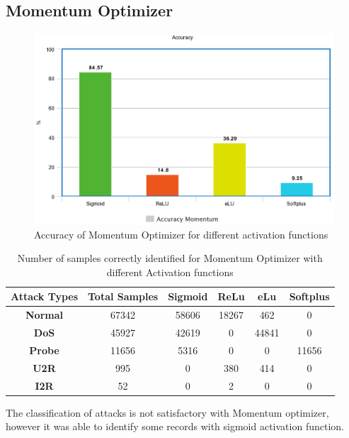 \documentclass[12pt, a4paper]{report}
\begin{document}
\subsection {Momentum Optimizer}
\begin{figure}[ht]
\centering
\captionsetup{justification=centering,margin=2cm}
\includegraphics[width=13cm]{accuracy_momentum_greedy.png}
\caption{ Accuracy of Momentum Optimizer for different activation functions}
\label{fig:accuracy_mom_greedy}
\end{figure}

\begin{table}[ht]
\centering
\captionsetup{justification=centering,margin=2cm}
\begin{tabular}{|c|c|c|c|c|c|}
\hline
\textbf{Attack Types} & \textbf{Total Samples} & \textbf{Sigmoid} & \textbf{ReLu} & \textbf{eLu} & \textbf{Softplus} \\ \hline
\textbf{Normal}       & 67342                  & 58606                           & 18267         & 462                           & 0             \\ \hline
\textbf{DoS}          & 45927                  & 42619          		       & 0                 &44841         			  & 0             \\ \hline
\textbf{Probe}        & 11656                  & 5316           			      & 0                  & 0        		 			& 11656            \\ \hline
\textbf{U2R}          & 995                      & 0             		      & 380           	 & 414                			  & 0               \\ \hline
\textbf{I2R}          & 52                          & 0               		            & 2            	 & 0           		            & 0                \\ \hline
\end{tabular}
\caption{Number of samples correctly identified for Momentum Optimizer with different Activation functions}
\label{confusion_mom}
\end{table}
The classification of attacks is not satisfactory with Momentum optimizer, however it was able to identify some records with sigmoid activation function.\\ \par
\end{document}
